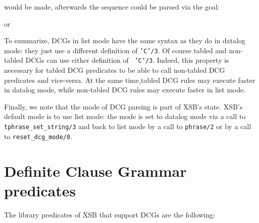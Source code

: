 
\noindent
would be made, afterwards the sequence could be parsed via the goal:


\noindent
or


To summarize, DCGs in list mode have the same syntax as they do in
datalog mode: they just use a different definition of {\tt 'C'/3}.  Of
course tabled and non-tabled DCGs can use either definition of {\tt
'C'/3}.  Indeed, this property is necessary for tabled DCG predicates
to be able to call non-tabled DCG predicates and vice-versa.  At the
same time,tabled DCG rules may execute faster in datalog mode, while
non-tabled DCG rules may execute faster in list mode.

Finally, we note that the mode of DCG parsing is part of XSB's state.
XSB's default mode is to use list mode: the mode is set to datalog
mode via a call to {\tt tphrase\_set\_string/3} and back to list mode
by a call to {\tt phrase/2} or by a call to {\tt reset\_dcg\_mode/0}.

\section{Definite Clause Grammar predicates} \label{DCG_builtins}
The library predicates of XSB that support DCGs are the following:

